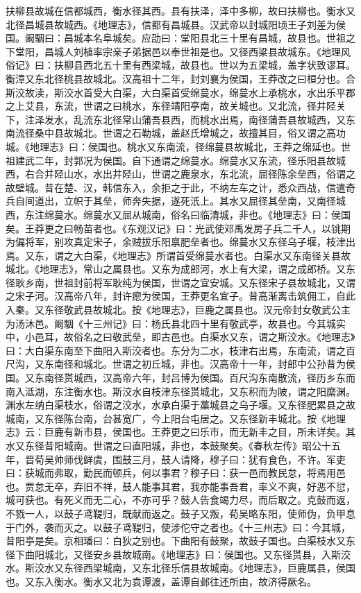 \documentclass[12pt,UTF8]{ctexbook}
\begin{document}
扶柳县故城在信都城西，衡水径其西。县有扶泽，泽中多柳，故曰扶柳也。衡水又北径昌城县故城西。《地理志》，信都有昌城县。汉武帝以封城阳顷王子刘差为侯国。阚駰曰：昌城本名阜城矣。应劭曰：堂阳县北三十里有昌城，故县也。世祖之下堂阳，昌城人刘植率宗亲子弟据邑以奉世祖是也。又径西粱县故城东。《地理风俗记》曰：扶柳县西北五十里有西梁城，故县也。世以为五梁城，盖字状致谬耳。衡漳又东北径桃县故城北。汉高祖十二年，封刘襄为侯国，王莽改之曰桓分也。合斯洨故渎，斯洨水首受大白渠，大白渠首受绵蔓水，绵蔓水上承桃水，水出乐平郡之上艾县，东流，世谓之曰桃水，东径靖阳亭南，故关城也。又北流，径井陉关下，注泽发水，乱流东北径常山蒲吾县西，而桃水出焉，南径蒲吾县故城西，又东南流径桑中县故城北。世谓之石勒城，盖赵氏增城之，故擅其目，俗又谓之高功城。《地理志》曰：侯国也。桃水又东南流，径绵蔓县故城北，王莽之绵延也。世祖建武二年，封郭况为侯国。自下通谓之绵蔓水。绵蔓水又东流，径乐阳县故城西，右合并陉山水，水出井陉山，世谓之鹿泉水，东北流，屈径陈余垒西，俗谓之故壁城。昔在楚、汉，韩信东入，余拒之于此，不纳左车之计，悉众西战，信遣奇兵自间道出，立帜于其垒，师奔失据，遂死汦上。其水又屈径其垒南，又南径城西，东注绵蔓水。绵蔓水又屈从城南，俗名曰临清城，非也。《地理志》曰：侯国矣。王莽更之曰畅苗者也。《东观汉记》曰：光武使邓禹发房子兵二千人，以铫期为偏将军，别攻真定宋子，余贼拔乐阳禀肥垒者也。绵蔓水又东径乌子堰，枝津出焉。又东，谓之大白渠，《地理志》所谓首受绵蔓水者也。白渠水又东南径关县故城北。《地理志》，常山之属县也。又东为成郎河，水上有大梁，谓之成郎桥。又东径耿乡南，世祖封前将军耿纯为侯国，世谓之宜安城。又东径宋子县故城北，又谓之宋子河。汉高帝八年，封许瘛为侯国，王莽更名宜子。昔高渐离击筑佣工，自此入秦。又东径敬武县故城北。按《地理志》，巨鹿之属县也。汉元帝封女敬武公主为汤沐邑。阚駰《十三州记》曰：杨氏县北四十里有敬武亭，故县也。今其城实中，小邑耳，故俗名之曰敬武垒，即古邑也。白渠水又东，谓之斯洨水。《地理志》曰：大白渠东南至下曲阳入斯洨者也。东分为二水，枝津右出焉，东南流，谓之百尺沟，又东南径和城北。世谓之初丘城，非也。汉高帝十一年，封郎中公孙昔为侯国。又东南径贳城西，汉高帝六年，封吕博为侯国。百尺沟东南散流，径历乡东而南入泜湖，东注衡水也。斯洨水自枝津东径贳城北，又东积而为陂，谓之阳縻渊。渊水左纳白渠枝水，俗谓之洨水，水承白渠于藁城县之乌子堰。又东径肥累县之故城南，又东径陈台南，台甚宽广，今上阳台屯居之。又东径新丰城北。按《地理志》云：巨鹿有新市县，侯国也。王莽更之曰乐市，而无新丰之目，所未详矣。其水又东径昔阳城南。世谓之曰直阳城，非也，本鼓聚矣。《春秋左传》昭公十五年，晋荀吴帅师伐鲜虞，围鼓三月，鼓人请降，穆子曰：犹有食色，不许。军吏曰：获城而弗取，勤民而顿兵，何以事君？穆子曰：获一邑而教民怠，将焉用邑也。贾怠无卒，弃旧不祥，鼓人能事其君，我亦能事吾君，率义不爽，好恶不愆，城可获也。有死义而无二心，不亦可乎？鼓人告食竭力尽，而后取之。克鼓而返，不戮一人，以鼓子鸢鞮归，既献而返之。鼓子又叛，荀吴略东阳，使师伪，负甲息于门外，袭而灭之。以鼓子鸢鞮归，使涉佗守之者也。《十三州志》曰：今其城，昔阳亭是矣。京相璠曰：白狄之别也。下曲阳有鼓聚，故鼓子国也。白渠枝水又东径下曲阳城北，又径安乡县故城南。《地理志》曰：侯国也。又东径贳县，入斯洨水。斯洨水又东径西梁城南，又东北径乐信县故城南。《地理志》，巨鹿属县，侯国也。又东入衡水。衡水又北为袁谭渡，盖谭自邺往还所由，故济得厥名。
\end{document}
